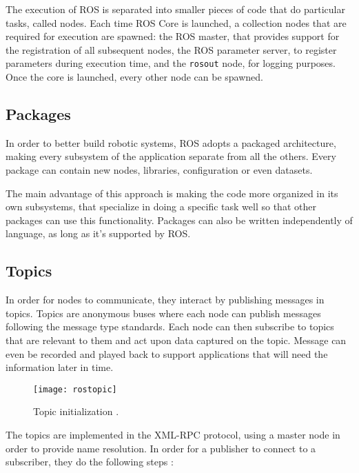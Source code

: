 The execution of ROS is separated into smaller pieces of code that do particular tasks, called nodes. Each time ROS Core is launched, a collection nodes that are required for execution are spawned: the ROS master, that provides support for the registration of all subsequent nodes, the ROS parameter server, to register parameters during execution time, and the \texttt{rosout} node, for logging purposes. Once the core is launched, every other node can be spawned.

\subsection{Packages}

In order to better build robotic systems, ROS adopts a packaged architecture, making every subsystem of the application separate from all the others. Every package can contain new nodes, libraries, configuration or even datasets.

The main advantage of this approach is making the code more organized in its own subsystems, that specialize in doing a specific task well so that other packages can use this functionality. Packages can also be written independently of language, as long as it's supported by ROS.

\subsection{Topics}

In order for nodes to communicate, they interact by publishing messages in topics. Topics are anonymous buses where each node can publish messages following the message type standards. Each node can then subscribe to topics that are relevant to them and act upon data captured on the topic. Message can even be recorded and played back to support applications that will need the information later in time.

\begin{figure}[!ht]
\centering
\texttt{[image: rostopic]}
\caption[Topic initialization.]{Topic initialization \cite{rosoverview}.}
\label{fig:rostopic}
\end{figure}

The topics are implemented in the XML-RPC protocol, using a master node in order to provide name resolution. In order for a publisher to connect to a subscriber, they do the following steps \cite{rosoverview}:

